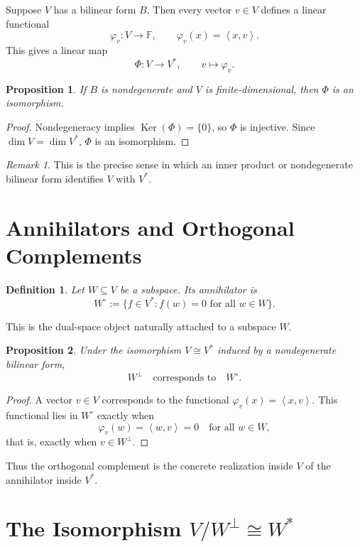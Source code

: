 \documentclass[11pt]{article}
\newtheorem{definition}{Definition}
\newtheorem{proposition}{Proposition}
\theoremstyle{remark}
\newtheorem{remark}{Remark}
\newcommand{\F}{\mathbb{F}}
\newcommand{\ip}[2]{\left\langle #1,#2\right\rangle}
\newcommand{\Ker}{\operatorname{Ker}}
\begin{document}
	Suppose \(V\) has a bilinear form \(B\). Then every vector \(v\in V\) defines a linear functional
	\[
	\varphi_v : V \to \F,\qquad \varphi_v(x)=\ip{x}{v}.
	\]
	This gives a linear map
	\[
	\Phi:V\to V^*,\qquad v\mapsto \varphi_v.
	\]
	
	\begin{proposition}
		If \(B\) is nondegenerate and \(V\) is finite-dimensional, then \(\Phi\) is an isomorphism.
	\end{proposition}
	
	\begin{proof}
		Nondegeneracy implies \(\Ker(\Phi)=\{0\}\), so \(\Phi\) is injective. Since \(\dim V=\dim V^*\), \(\Phi\) is an isomorphism.
	\end{proof}
	
	\begin{remark}
		This is the precise sense in which an inner product or nondegenerate bilinear form identifies \(V\) with \(V^*\).
	\end{remark}
	
	\section{Annihilators and Orthogonal Complements}
	
	\begin{definition}
		Let \(W\subseteq V\) be a subspace. Its \emph{annihilator} is
		\[
		W^\circ := \{f\in V^*: f(w)=0 \text{ for all } w\in W\}.
		\]
	\end{definition}
	
	This is the dual-space object naturally attached to a subspace \(W\).
	
	\begin{proposition}
		Under the isomorphism \(V\cong V^*\) induced by a nondegenerate bilinear form,
		\[
		W^\perp \quad\text{corresponds to}\quad W^\circ.
		\]
	\end{proposition}
	
	\begin{proof}
		A vector \(v\in V\) corresponds to the functional \(\varphi_v(x)=\ip{x}{v}\). This functional lies in \(W^\circ\) exactly when
		\[
		\varphi_v(w)=\ip{w}{v}=0 \quad \text{for all } w\in W,
		\]
		that is, exactly when \(v\in W^\perp\).
	\end{proof}
	
	Thus the orthogonal complement is the concrete realization inside \(V\) of the annihilator inside \(V^*\).
	
	\section{The Isomorphism \(V/W^\perp \cong W^*\)}
	
\end{document}
